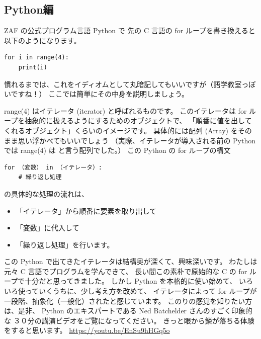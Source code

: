 \documentclass[dvipdfmx,autodetect-engine,10pt,b5paper,papersize,openany,dvipsnames]{jsbook}
\begin{document}
\begin{multicols}{2}
\section*{Python編}
ZAF の公式プログラム言語 Python で
先の C 言語の for ループを書き換えると以下のようになります。
\begin{lstlisting}
for i in range(4):
    print(i)
\end{lstlisting}

\noindent
慣れるまでは、これをイディオムとして丸暗記してもいいですが（語学教室っぽいですね！）
ここでは簡単にその中身を説明しましょう。

{\ttfamily range(4)} はイテレータ (iterator) と呼ばれるものです。
このイテレータは for ループを抽象的に扱えるようにするためのオブジェクトで、
「順番に値を出してくれるオブジェクト」くらいのイメージです。
具体的には配列 (Array) をそのまま思い浮かべてもいいでしょう
（実際、イテレータが導入される前の Python では {\ttfamily range(4)} は
{\ttfamily [0, 1, 2, 3]} と言う配列でした。）
この Python の for ループの構文
\begin{lstlisting}
for （変数） in （イテレータ）:
    # 繰り返し処理
\end{lstlisting}
の具体的な処理の流れは、
{\small
  \begin{itemize}
  \item 「イテレータ」から順番に要素を取り出して
  \item 「変数」に代入して
  \item 「繰り返し処理」を行います。
  \end{itemize}
}

この Python で出てきたイテレータは結構奥が深くて、興味深いです。
わたしは元々 C 言語でプログラムを学んできて、
長い間この素朴で原始的な C の for ループで十分だと思ってきました。
しかし Python を本格的に使い始めて、
いろいろ使っていくうちに、少し考え方を改めて、
イテレータによって for ループが一段階、抽象化（一般化）されたと感じています。
このりの感覚を知りたい方は、是非、
Python のエキスパートである Ned Batchelder さんのすごく印象的な
３０分の講演ビデオをご覧になってください。
きっと眼から鱗が落ちる体験をすると思います。
\url{https://youtu.be/EnSu9hHGq5o}



\end{multicols}
\end{document}
